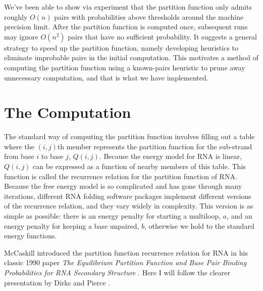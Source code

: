 We've been able to show via experiment that the partition function
only admits roughly $O(n)$ pairs with probabilities above thresholds
around the machine precision limit. After the partition function is
computed once, subsequent runs may ignore $O(n^2)$ pairs that have no
sufficient probability. It suggests a general strategy to speed up the
partition function, namely developing heuristics to eliminate
improbable pairs in the initial computation. This motivates a method
of computing the partition function using a known-pairs heuristic to
prune away unnecessary computation, and that is what we have
implemented.

\section{The Computation}

The standard way of computing the partition function involves filling
out a table where the $(i,j)$th member represents the partition
function for the sub-strand from base $i$ to base $j$,
$Q(i,j)$. Because the energy model for RNA is linear, $Q(i,j)$ can be
expressed as a function of nearby members of this table. This function
is called the recurrence relation for the partition function of
RNA. Because the free energy model is so complicated and has gone
through many iterations, different RNA folding software packages
implement different versions of the recurrence relation, and they vary
widely in complexity. This version is as simple as possible: there is
an energy penalty for starting a multiloop, $a$, and an energy penalty
for keeping a base unpaired, $b$, otherwise we hold to the standard
energy functions.

McCaskill introduced the partition function recurrence relation for
RNA in his classic 1990 paper \emph{The Equilibrium Partition Function
  and Base Pair Binding Probabilities for RNA Secondary Structure}
\cite{mccaskill1990equilibrium}. Here I will follow the clearer
presentation by Dirks and Pierce \cite{dirks2003partition}.

